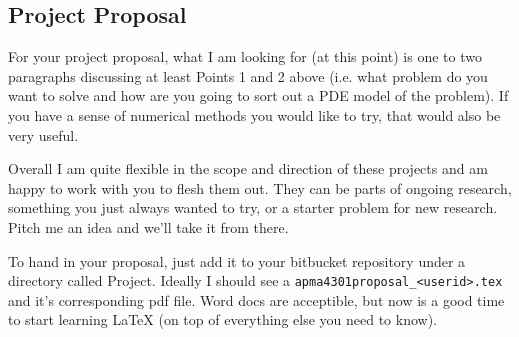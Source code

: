\documentclass[12pt]{article}
\begin{document}
\subsection*{Project Proposal}
\label{sec:project-proposal}

For your project proposal, what I am looking for (at this point) is one
to two paragraphs discussing at least Points 1 and 2 above (i.e. what
problem do you want to solve and how are you going to sort out a PDE
model of the problem).  If you have a sense of numerical methods you
would like to try, that would also be very useful.

Overall I am quite flexible in the scope and direction of these
projects and am happy to work with you to flesh them out.  They can be
parts of ongoing research,  something you just always wanted to try,
or a starter problem for new research.  Pitch me an idea and we'll
take it from there.

To hand in your proposal, just add it to your bitbucket repository
under a directory called Project.  Ideally I should see a
\texttt{apma4301proposal\_<userid>.tex} and it's corresponding pdf
file.  Word docs are acceptible, but now is a good time to start
learning \LaTeX{} (on top of everything else you need to know).
\end{document}

